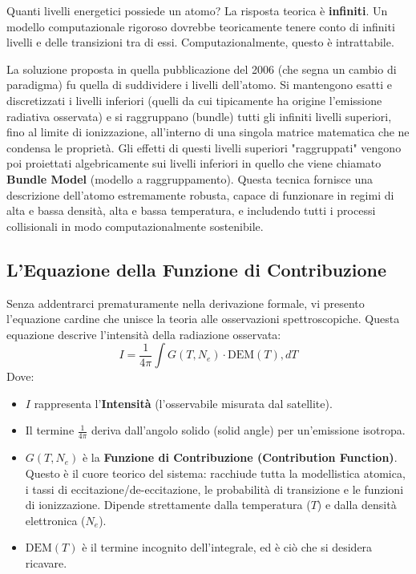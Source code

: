 Quanti livelli energetici possiede un atomo?
La risposta teorica è \textbf{infiniti}.
Un modello computazionale rigoroso dovrebbe teoricamente tenere conto di infiniti livelli e delle transizioni tra di essi. Computazionalmente, questo è intrattabile.

La soluzione proposta in quella pubblicazione del 2006 (che segna un cambio di paradigma) fu quella di suddividere i livelli dell'atomo. Si mantengono esatti e discretizzati i livelli inferiori (quelli da cui tipicamente ha origine l'emissione radiativa osservata) e si raggruppano (bundle) tutti gli infiniti livelli superiori, fino al limite di ionizzazione, all'interno di una singola matrice matematica che ne condensa le proprietà.
Gli effetti di questi livelli superiori "raggruppati" vengono poi proiettati algebricamente sui livelli inferiori in quello che viene chiamato \textbf{Bundle Model} (modello a raggruppamento). Questa tecnica fornisce una descrizione dell'atomo estremamente robusta, capace di funzionare in regimi di alta e bassa densità, alta e bassa temperatura, e includendo tutti i processi collisionali in modo computazionalmente sostenibile.

    \subsection{L'Equazione della Funzione di Contribuzione}
    
    Senza addentrarci prematuramente nella derivazione formale, vi presento l'equazione cardine che unisce la teoria alle osservazioni spettroscopiche. Questa equazione descrive l'intensità della radiazione osservata:
    \begin{equation}
    I = \frac{1}{4\pi} \int G(T, N_e) \cdot \text{DEM}(T) , dT
    \end{equation}
    Dove:
    \begin{itemize}
        \item $I$ rappresenta l'\textbf{Intensità} (l'osservabile misurata dal satellite).
        \item Il termine $\frac{1}{4\pi}$ deriva dall'angolo solido (solid angle) per un'emissione isotropa.
        \item $G(T, N_e)$ è la \textbf{Funzione di Contribuzione (Contribution Function)}. Questo è il cuore teorico del sistema: racchiude tutta la modellistica atomica, i tassi di eccitazione/de-eccitazione, le probabilità di transizione e le funzioni di ionizzazione. Dipende strettamente dalla temperatura ($T$) e dalla densità elettronica ($N_e$).
        \item $\text{DEM}(T)$ è il termine incognito dell'integrale, ed è ciò che si desidera ricavare.
    \end{itemize}
    
